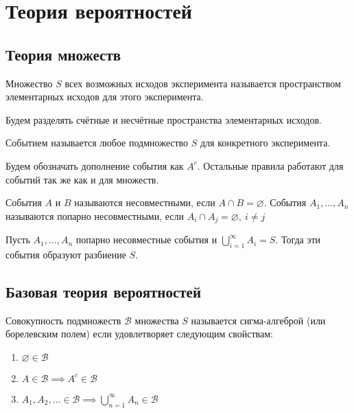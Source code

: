 \documentclass[document]{subfiles}
\begin{document}
\chapter{Теория вероятностей}
\section{Теория множеств}

\begin{definition}
    Множество $S$ всех возможных исходов эксперимента называется пространством элементарных исходов для этого эксперимента.
\end{definition}

Будем разделять счётные и несчётные пространства элементарных исходов.

\begin{definition}
    Событием называется любое подмножество $S$ для конкретного эксперимента.
\end{definition}

\begin{remark}
    Будем обозначать дополнение события как $A^c$. Остальные правила работают для событий так же как и для множеств.
\end{remark}

\begin{definition}
    События $A$ и $B$ называются несовместными, если $A \cap B = \varnothing$. События $A_1, \dots, A_n$ называются попарно несовместными, если $A_i \cap A_j = \varnothing, ~ i \ne j$
\end{definition}

\begin{definition}
    Пусть $A_1, \dots, A_n$ попарно несовместные события и $\bigcup_{i=1}^\infty A_i = S$. Тогда эти события образуют разбиение $S$.
\end{definition}

\section{Базовая теория вероятностей}

\begin{definition}
    Совокупность подмножеств $\mathcal{B}$ множества $S$ называется сигма-алгеброй (или борелевским полем) если удовлетворяет следующим свойствам:
    \begin{enumerate}
        \item $\varnothing \in \mathcal{B}$
        \item $A \in \mathcal{B} \implies A^c \in \mathcal{B}$
        \item $A_1, A_2, \dots \in \mathcal{B} \implies \bigcup_{n=1}^\infty A_n \in \mathcal{B}$
    \end{enumerate}
\end{definition}
\end{document}
